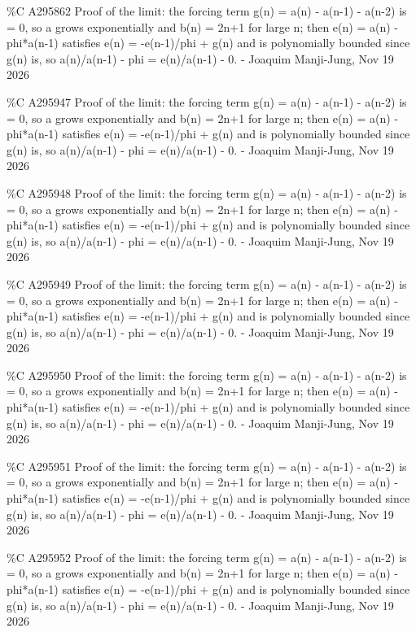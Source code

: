 {\%C A295862 Proof of the limit: the forcing term g(n) = a(n) - a(n-1) - a(n-2) is = 0, so a grows exponentially and b(n) = 2n+1 for large n; then e(n) = a(n) - phi*a(n-1) satisfies e(n) = -e(n-1)/phi + g(n) and is polynomially bounded since g(n) is, so a(n)/a(n-1) - phi = e(n)/a(n-1) - 0. - Joaquim Manji-Jung, Nov 19 2026\par
\%C A295947 Proof of the limit: the forcing term g(n) = a(n) - a(n-1) - a(n-2) is = 0, so a grows exponentially and b(n) = 2n+1 for large n; then e(n) = a(n) - phi*a(n-1) satisfies e(n) = -e(n-1)/phi + g(n) and is polynomially bounded since g(n) is, so a(n)/a(n-1) - phi = e(n)/a(n-1) - 0. - Joaquim Manji-Jung, Nov 19 2026\par
\%C A295948 Proof of the limit: the forcing term g(n) = a(n) - a(n-1) - a(n-2) is = 0, so a grows exponentially and b(n) = 2n+1 for large n; then e(n) = a(n) - phi*a(n-1) satisfies e(n) = -e(n-1)/phi + g(n) and is polynomially bounded since g(n) is, so a(n)/a(n-1) - phi = e(n)/a(n-1) - 0. - Joaquim Manji-Jung, Nov 19 2026\par
\%C A295949 Proof of the limit: the forcing term g(n) = a(n) - a(n-1) - a(n-2) is = 0, so a grows exponentially and b(n) = 2n+1 for large n; then e(n) = a(n) - phi*a(n-1) satisfies e(n) = -e(n-1)/phi + g(n) and is polynomially bounded since g(n) is, so a(n)/a(n-1) - phi = e(n)/a(n-1) - 0. - Joaquim Manji-Jung, Nov 19 2026\par
\%C A295950 Proof of the limit: the forcing term g(n) = a(n) - a(n-1) - a(n-2) is = 0, so a grows exponentially and b(n) = 2n+1 for large n; then e(n) = a(n) - phi*a(n-1) satisfies e(n) = -e(n-1)/phi + g(n) and is polynomially bounded since g(n) is, so a(n)/a(n-1) - phi = e(n)/a(n-1) - 0. - Joaquim Manji-Jung, Nov 19 2026\par
\%C A295951 Proof of the limit: the forcing term g(n) = a(n) - a(n-1) - a(n-2) is = 0, so a grows exponentially and b(n) = 2n+1 for large n; then e(n) = a(n) - phi*a(n-1) satisfies e(n) = -e(n-1)/phi + g(n) and is polynomially bounded since g(n) is, so a(n)/a(n-1) - phi = e(n)/a(n-1) - 0. - Joaquim Manji-Jung, Nov 19 2026\par
\%C A295952 Proof of the limit: the forcing term g(n) = a(n) - a(n-1) - a(n-2) is = 0, so a grows exponentially and b(n) = 2n+1 for large n; then e(n) = a(n) - phi*a(n-1) satisfies e(n) = -e(n-1)/phi + g(n) and is polynomially bounded since g(n) is, so a(n)/a(n-1) - phi = e(n)/a(n-1) - 0. - Joaquim Manji-Jung, Nov 19 2026\par
}
